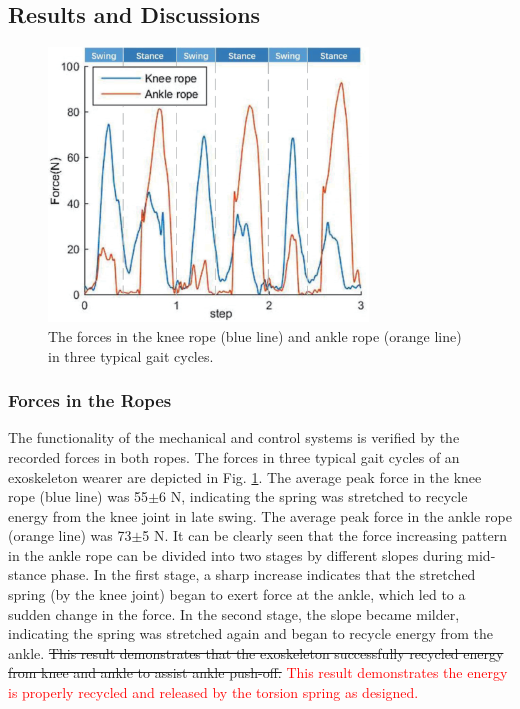 \documentclass[twocolumn,cleanfoot,10pt]{asme2ej}
\begin{document}
\subsection{Results and Discussions}

\begin{figure}[b]
	\centering
	\includegraphics[width=8.5cm]{forces.eps}
	\caption{The forces in the knee rope (blue line) and ankle rope (orange line) in three typical gait cycles.}
	\label{fig:force}
\end{figure}

\subsubsection{Forces in the Ropes}
The functionality of the mechanical and control systems is verified by the recorded forces in both ropes.
The forces in three typical gait cycles of an exoskeleton wearer are depicted in Fig. \ref{fig:force}.
The average peak force in the knee rope (blue line) was 55$\pm$6 N, indicating the spring was stretched to recycle energy from the knee joint in late swing.
The average peak force in the ankle rope (orange line) was 73$\pm$5 N.
It can be clearly seen that the force increasing pattern in the ankle rope can be divided into two stages by different slopes during mid-stance phase.
In the first stage, a sharp increase indicates that the stretched spring (by the knee joint) began to exert force at the ankle, which led to a sudden change in the force.
In the second stage, the slope became milder, indicating the spring was stretched again and began to recycle energy from the ankle.
\sout{This result demonstrates that the exoskeleton successfully recycled energy from knee and ankle to assist ankle push-off.}
\textcolor{red}{This result demonstrates the energy is properly recycled and released by the torsion spring as designed.}
\end{document}
